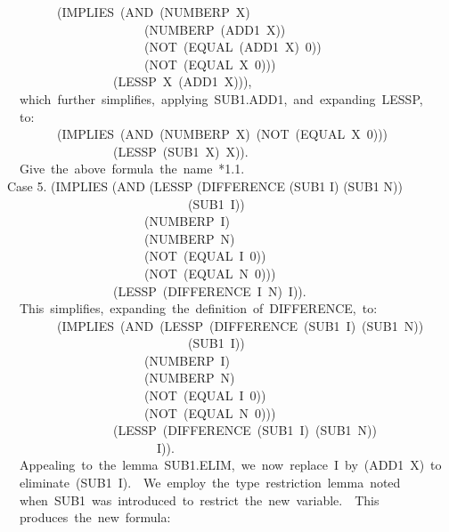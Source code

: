 \documentclass[10pt]{book}
\newenvironment{pubasis}{\begin{flushleft}}{\end{flushleft}}
\begin{document}
\begin{pubasis}
~~~~~~~~(IMPLIES~(AND~(NUMBERP~X)\\
~~~~~~~~~~~~~~~~~~~~~~(NUMBERP~(ADD1~X))\\
~~~~~~~~~~~~~~~~~~~~~~(NOT~(EQUAL~(ADD1~X)~0))\\
~~~~~~~~~~~~~~~~~~~~~~(NOT~(EQUAL~X~0)))\\
~~~~~~~~~~~~~~~~~(LESSP~X~(ADD1~X))),\\

~~which~further~simplifies,~applying~SUB1.ADD1,~and~expanding~LESSP,\\
~~to:\\

~~~~~~~~(IMPLIES~(AND~(NUMBERP~X)~(NOT~(EQUAL~X~0)))\\
~~~~~~~~~~~~~~~~~(LESSP~(SUB1~X)~X)).\\

~~Give~the~above~formula~the~name~*1.1.\\

Case 5.	(IMPLIES (AND (LESSP (DIFFERENCE (SUB1 I) (SUB1 N))\\
~~~~~~~~~~~~~~~~~~~~~~~~~~~~~(SUB1~I))\\
~~~~~~~~~~~~~~~~~~~~~~(NUMBERP~I)\\
~~~~~~~~~~~~~~~~~~~~~~(NUMBERP~N)\\
~~~~~~~~~~~~~~~~~~~~~~(NOT~(EQUAL~I~0))\\
~~~~~~~~~~~~~~~~~~~~~~(NOT~(EQUAL~N~0)))\\
~~~~~~~~~~~~~~~~~(LESSP~(DIFFERENCE~I~N)~I)).\\

~~This~simplifies,~expanding~the~definition~of~DIFFERENCE,~to:\\

~~~~~~~~(IMPLIES~(AND~(LESSP~(DIFFERENCE~(SUB1~I)~(SUB1~N))\\
~~~~~~~~~~~~~~~~~~~~~~~~~~~~~(SUB1~I))\\
~~~~~~~~~~~~~~~~~~~~~~(NUMBERP~I)\\
~~~~~~~~~~~~~~~~~~~~~~(NUMBERP~N)\\
~~~~~~~~~~~~~~~~~~~~~~(NOT~(EQUAL~I~0))\\
~~~~~~~~~~~~~~~~~~~~~~(NOT~(EQUAL~N~0)))\\
~~~~~~~~~~~~~~~~~(LESSP~(DIFFERENCE~(SUB1~I)~(SUB1~N))\\
~~~~~~~~~~~~~~~~~~~~~~~~I)).\\

~~Appealing~to~the~lemma~SUB1.ELIM,~we~now~replace~I~by~(ADD1~X)~to\\
~~eliminate~(SUB1~I).~~We~employ~the~type~restriction~lemma~noted\\
~~when~SUB1~was~introduced~to~restrict~the~new~variable.~~This\\
~~produces~the~new~formula:\\


\end{pubasis}
\end{document}
